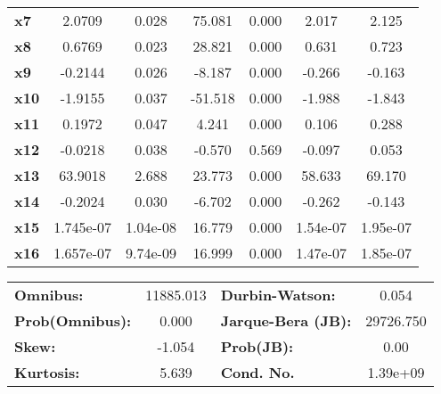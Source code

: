 \documentclass{article}
\begin{document}
\begin{center}
\begin{tabular}{lcccccc}
\textbf{x7}    &       2.0709  &        0.028     &    75.081  &         0.000        &        2.017    &        2.125     \\
\textbf{x8}    &       0.6769  &        0.023     &    28.821  &         0.000        &        0.631    &        0.723     \\
\textbf{x9}    &      -0.2144  &        0.026     &    -8.187  &         0.000        &       -0.266    &       -0.163     \\
\textbf{x10}   &      -1.9155  &        0.037     &   -51.518  &         0.000        &       -1.988    &       -1.843     \\
\textbf{x11}   &       0.1972  &        0.047     &     4.241  &         0.000        &        0.106    &        0.288     \\
\textbf{x12}   &      -0.0218  &        0.038     &    -0.570  &         0.569        &       -0.097    &        0.053     \\
\textbf{x13}   &      63.9018  &        2.688     &    23.773  &         0.000        &       58.633    &       69.170     \\
\textbf{x14}   &      -0.2024  &        0.030     &    -6.702  &         0.000        &       -0.262    &       -0.143     \\
\textbf{x15}   &    1.745e-07  &     1.04e-08     &    16.779  &         0.000        &     1.54e-07    &     1.95e-07     \\
\textbf{x16}   &    1.657e-07  &     9.74e-09     &    16.999  &         0.000        &     1.47e-07    &     1.85e-07     \\
\bottomrule
\end{tabular}
\begin{tabular}{lclc}
\textbf{Omnibus:}       & 11885.013 & \textbf{  Durbin-Watson:     } &     0.054  \\
\textbf{Prob(Omnibus):} &    0.000  & \textbf{  Jarque-Bera (JB):  } & 29726.750  \\
\textbf{Skew:}          &   -1.054  & \textbf{  Prob(JB):          } &      0.00  \\
\textbf{Kurtosis:}      &    5.639  & \textbf{  Cond. No.          } &  1.39e+09  \\
\bottomrule
\end{tabular}
\end{center}
\end{document}
